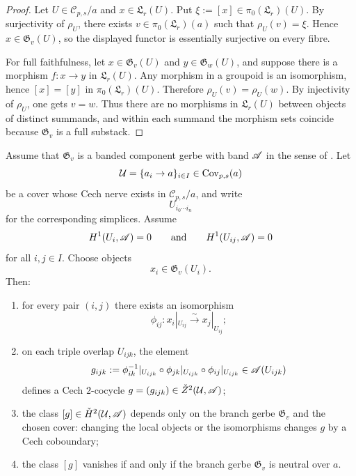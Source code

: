 \begin{proof}
Let $U\in \mathcal C_{p,s}/a$ and $x\in \mathfrak L_r(U)$. Put $\xi:=[x]\in \pi_0(\mathfrak L_r)(U)$. By surjectivity of $\rho_U$, there exists $v\in \pi_0(\mathfrak L_r)(a)$ such that $\rho_U(v)=\xi$. Hence $x\in \mathfrak G_v(U)$, so the displayed functor is essentially surjective on every fibre.

For full faithfulness, let $x\in \mathfrak G_v(U)$ and $y\in \mathfrak G_w(U)$, and suppose there is a morphism $f:x\to y$ in $\mathfrak L_r(U)$. Any morphism in a groupoid is an isomorphism, hence $[x]=[y]$ in $\pi_0(\mathfrak L_r)(U)$. Therefore $\rho_U(v)=\rho_U(w)$. By injectivity of $\rho_U$, one gets $v=w$. Thus there are no morphisms in $\mathfrak L_r(U)$ between objects of distinct summands, and within each summand the morphism sets coincide because $\mathfrak G_v$ is a full substack.
\end{proof}

\begin{theorem}\label{thm:cech-bridge-compatible-realizations}
Assume that $\mathfrak G_v$ is a banded component gerbe with band $\mathscr{A}$ in the sense of . Let
\[
\mathcal U=\{a_i\to a\}_{i\in I}\in \mathrm{Cov}_{p,s}(a)
\]
be a cover whose Cech nerve exists in $\mathcal C_{p,s}/a$, and write
\[
U_{i_0\cdots i_n}
\]
for the corresponding simplices. Assume
\[
H^1(U_i,\mathscr{A})=0
\qquad\text{and}\qquad
H^1(U_{ij},\mathscr{A})=0
\]
for all $i,j\in I$. Choose objects
\[
x_i\in \mathfrak G_v(U_i).
\]
Then:
\begin{enumerate}[label=(\roman*),nosep]
\item for every pair $(i,j)$ there exists an isomorphism
\[
\phi_{ij}:x_i|_{U_{ij}}\xrightarrow{\sim} x_j|_{U_{ij}};
\]
\item on each triple overlap $U_{ijk}$, the element
\[
g_{ijk}:=\phi_{ik}^{-1}|_{U_{ijk}}\circ \phi_{jk}|_{U_{ijk}}\circ \phi_{ij}|_{U_{ijk}}
\in \mathscr{A}(U_{ijk})
\]
defines a Cech $2$-cocycle $g=(g_{ijk})\in \check Z^2(\mathcal U,\mathscr{A})$;
\item the class $[g]\in \check{H}^2(\mathcal U,\mathscr{A})$ depends only on the branch gerbe $\mathfrak G_v$ and the chosen cover: changing the local objects or the isomorphisms changes $g$ by a Cech coboundary;
\item the class $[g]$ vanishes if and only if the branch gerbe $\mathfrak G_v$ is neutral over $a$.
\end{enumerate}
\end{theorem}

